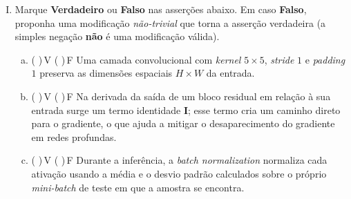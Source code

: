 \documentclass{dlproblemset}
\begin{document}
\begin{enumerate}[I)]
    \textbf{II.} Na degradação, o erro elevado da rede mais profunda aparece já no conjunto de \textbf{treino}, enquanto o \textit{overfitting} se caracteriza por erro de treino baixo acompanhado de erro de validação alto.

    Assinale a alternativa correta:
    \begin{enumerate}[a)]
        \item As asserções I e II são verdadeiras, e a II é uma justificativa correta da I.
        \item As asserções I e II são verdadeiras, mas a II não é uma justificativa correta da I.
        \item As asserções I e II são verdadeiras, e a I é uma justificativa correta da II, mas não o contrário.
        \item A asserção I é verdadeira, e a II é falsa.
        \item A asserção I é falsa, e a II é verdadeira.
        \item As asserções I e II são falsas.
        \item A asserção I é verdadeira somente quando a rede usa \textit{batch normalization}, e a II é verdadeira.
        \item A asserção I é falsa somente para redes treinadas com SGD sem \textit{momentum}, e a II é falsa.
    \end{enumerate}

    \item Marque \textbf{Verdadeiro} ou \textbf{Falso} nas asserções abaixo. Em caso \textbf{Falso}, proponha uma modificação \emph{não-trivial} que torna a asserção verdadeira (a simples negação \textbf{não} é uma modificação válida).

    \begin{enumerate}[a)]
        \item ( )\,V \quad ( )\,F \quad Uma camada convolucional com \textit{kernel} $5 \times 5$, \textit{stride} $1$ e \textit{padding} $1$ preserva as dimensões espaciais $H \times W$ da entrada.

        \item ( )\,V \quad ( )\,F \quad Na derivada da saída de um bloco residual em relação à sua entrada surge um termo identidade $\mathbf{I}$; esse termo cria um caminho direto para o gradiente, o que ajuda a mitigar o desaparecimento do gradiente em redes profundas.

        \item ( )\,V \quad ( )\,F \quad Durante a inferência, a \textit{batch normalization} normaliza cada ativação usando a média e o desvio padrão calculados sobre o próprio \textit{mini-batch} de teste em que a amostra se encontra.


\end{enumerate}
\end{enumerate}
\end{document}

